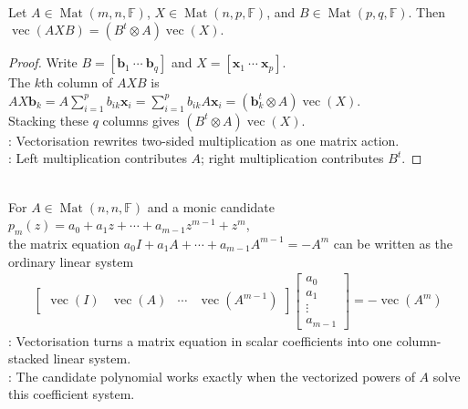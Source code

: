 \begin{theorem} \label{thm:vectorization-of-triple-product} \\
Let $A\in\operatorname{Mat}(m,n,\mathbb{F})$, $X\in\operatorname{Mat}(n,p,\mathbb{F})$, and $B\in\operatorname{Mat}(p,q,\mathbb{F})$. Then $\operatorname{vec}(AXB)=(B^t\otimes A)\operatorname{vec}(X)$.
\begin{proof}
Write $B=[\mathbf{b}_1\ \cdots\ \mathbf{b}_q]$ and $X=[\mathbf{x}_1\ \cdots\ \mathbf{x}_p]$.\\
The $k$th column of $AXB$ is $AX\mathbf{b}_k=A\sum\limits_{i=1}^{p}b_{ik}\mathbf{x}_i =\sum\limits_{i=1}^{p}b_{ik}A\mathbf{x}_i =(\mathbf{b}_k^t\otimes A)\operatorname{vec}(X)$.\\
Stacking these $q$ columns gives $(B^t\otimes A)\operatorname{vec}(X)$.\\
: Vectorisation rewrites two-sided multiplication as one matrix action.\\
: Left multiplication contributes $A$; right multiplication contributes $B^t$.
\end{proof}
\end{theorem}

\begin{perspective} \label{per:vectorized-minimal-polynomial-linear-system} \\
For $A\in\operatorname{Mat}(n,n,\mathbb{F})$ and a monic candidate $p_m(z)=a_0+a_1z+\cdots+a_{m-1}z^{m-1}+z^m$,\\
the matrix equation $a_0I+a_1A+\cdots+a_{m-1}A^{m-1}=-A^m$ can be written as the ordinary linear system
\begin{align}
\begin{bmatrix}
\operatorname{vec}(I)&\operatorname{vec}(A)&\cdots&\operatorname{vec}(A^{m-1})
\end{bmatrix}
\begin{bmatrix}
a_0\\a_1\\ \vdots\\ a_{m-1}
\end{bmatrix}
=-\operatorname{vec}(A^m) \nonumber
\end{align}
: Vectorisation turns a matrix equation in scalar coefficients into one column-stacked linear system.\\
: The candidate polynomial works exactly when the vectorized powers of $A$ solve this coefficient system.
\end{perspective}

